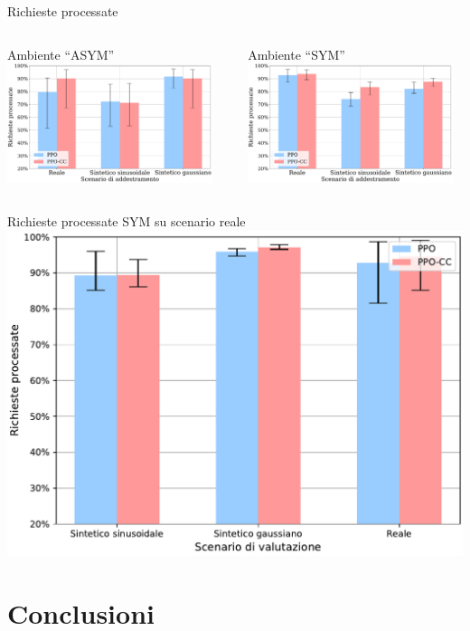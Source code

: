 \documentclass[]{beamer}
\begin{document}
\begin{frame}{Richieste processate}
    \begin{columns}
        \begin{column}{.5\textwidth}
            \centering
            \small Ambiente ``ASYM''
            \includegraphics[width=6cm]{assets/5/results/eval_ASYM_summary_processed_requests.pdf}
        \end{column}
        \begin{column}{.5\textwidth}
            \centering
            \small Ambiente ``SYM''
            \includegraphics[width=6cm]{assets/5/results/eval_SYM_summary_processed_requests.pdf}
        \end{column}
    \end{columns}
\end{frame}

\begin{frame}{Richieste processate SYM su scenario reale}
    \centering
    \includegraphics[width=.8\textwidth]{assets/5/results/eval_SYM_train_real_processed_requests.pdf}
\end{frame}

\section{Conclusioni}
    
\end{document}
